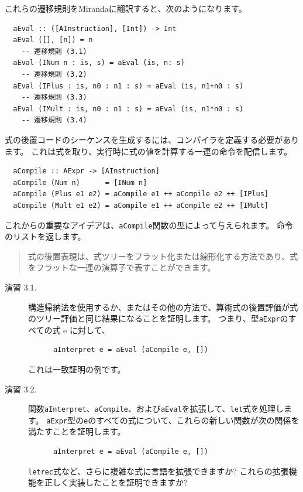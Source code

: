 \documentclass{jbook}
\begin{document}
これらの遷移規則をMirandaに翻訳すると、次のようになります。

\begin{verbatim}
  aEval :: ([AInstruction], [Int]) -> Int
  aEval ([], [n]) = n
    -- 遷移規則 (3.1)
  aEval (INum n : is, s) = aEval (is, n: s)
    -- 遷移規則 (3.2)
  aEval (IPlus : is, n0 : n1 : s) = aEval (is, n1+n0 : s)
    -- 遷移規則 (3.3)
  aEval (IMult : is, n0 : n1 : s) = aEval (is, n1*n0 : s)
    -- 遷移規則 (3.4)
\end{verbatim}

式の後置コードのシーケンスを生成するには、コンパイラを定義する必要があります。
これは式を取り、実行時に式の値を計算する一連の命令を配信します。

\begin{verbatim}
  aCompile :: AExpr -> [AInstruction]
  aCompile (Num n)      = [INum n]
  aCompile (Plus e1 e2) = aCompile e1 ++ aCompile e2 ++ [IPlus]
  aCompile (Mult e1 e2) = aCompile e1 ++ aCompile e2 ++ [IMult]
\end{verbatim}

これからの重要なアイデアは、\texttt{aCompile}関数の型によって与えられます。
命令のリストを返します。

\begin{quotation}
	式の後置表現は、式ツリーをフラット化または線形化する方法であり、式をフラットな一連の演算子で表すことができます。
\end{quotation}

\begin{description}
	\item[演習 3.1.] 構造帰納法を使用するか、またはその他の方法で、算術式の後置評価が式のツリー評価と同じ結果になることを証明します。
		つまり、型\texttt{aExpr}のすべての式 e に対して、
		\begin{verbatim}
      aInterpret e = aEval (aCompile e, [])
    \end{verbatim}
		これは一致証明の例です。
	\item[演習 3.2.] 関数\texttt{aInterpret}、\texttt{aCompile}、および\texttt{aEval}を拡張して、\texttt{let}式を処理します。
		\texttt{aExpr}型の\texttt{e}のすべての式について、これらの新しい関数が次の関係を満たすことを証明します。
		\begin{verbatim}
      aInterpret e = aEval (aCompile e, [])
    \end{verbatim}
		\texttt{letrec}式など、さらに複雑な式に言語を拡張できますか?
		これらの拡張機能を正しく実装したことを証明できますか?
\end{description}
\end{document}
